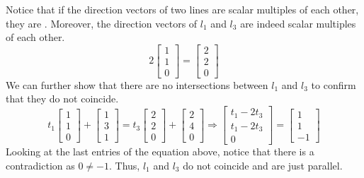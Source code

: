 \begin{SaveQuestion}
\begin{enumerate}
        Notice that if the direction vectors of two lines are scalar multiples of each other, they are . Moreover, the direction vectors of $l_1$ and $l_3$ are indeed scalar multiples of each other.
        $$2 \begin{bmatrix} 1 \\ 1 \\ 0 \end{bmatrix} = \begin{bmatrix} 2 \\ 2 \\ 0 \end{bmatrix}$$
        We can further show that there are no intersections between $l_1$ and $l_3$ to confirm that they do not coincide. 
        $$t_1 \begin{bmatrix} 1 \\ 1 \\ 0\end{bmatrix} + \begin{bmatrix} 1 \\ 3 \\ 1 \end{bmatrix} = t_3 \begin{bmatrix} 2 \\ 2 \\ 0 \end{bmatrix} + \begin{bmatrix}  2 \\ 4 \\ 0 \end{bmatrix} \Longrightarrow \begin{bmatrix} t_1 - 2t_3 \\ t_1 - 2t_3 \\ 0 \end{bmatrix} = \begin{bmatrix} 1 \\ 1 \\ -1 \end{bmatrix}$$
        Looking at the last entries of the equation above, notice that there is a contradiction as $0 \neq -1$. Thus, $l_1$ and $l_3$ do not coincide and are just parallel.


\end{enumerate}
\end{SaveQuestion}
